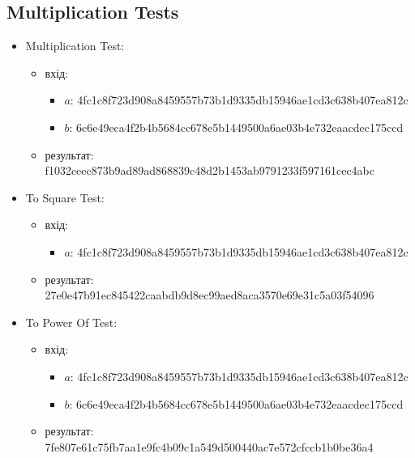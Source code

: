 \documentclass{article}
\begin{document}
\subsection{Multiplication Tests}
\begin{itemize}
    \item Multiplication Test:
        \begin{itemize}
            \item вхід: 
                \begin{itemize}
                    \item $a$: 4fc1c8f723d908a8459557b73b1d9335db15946ae1cd3c638b407ea812c
                    \item $b$: 6c6e49eca4f2b4b5684cc678e5b1449500a6ae03b4e732eaacdec175ccd
                \end{itemize}
            \item результат: f1032ceec873b9ad89ad868839c48d2b1453ab9791233f597161cec4abc
        \end{itemize}
    \item To Square Test:
        \begin{itemize}
            \item вхід: 
                \begin{itemize}
                    \item $a$: 4fc1c8f723d908a8459557b73b1d9335db15946ae1cd3c638b407ea812c
                \end{itemize}
            \item результат: 27e0e47b91ec845422caabdb9d8ec99aed8aca3570e69e31c5a03f54096
        \end{itemize}
    \item To Power Of Test:
        \begin{itemize}
            \item вхід: 
                \begin{itemize}
                    \item $a$: 4fc1c8f723d908a8459557b73b1d9335db15946ae1cd3c638b407ea812c
                    \item $b$: 6c6e49eca4f2b4b5684cc678e5b1449500a6ae03b4e732eaacdec175ccd
                \end{itemize}
            \item результат: 7fe807e61c75fb7aa1e9fc4b09c1a549d500440ac7e572cfccb1b0be36a4
        \end{itemize}
\end{itemize}
\end{document}
